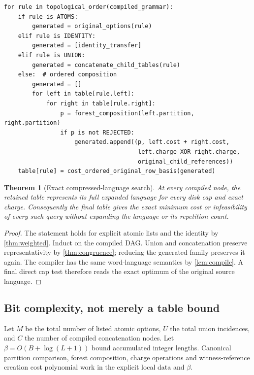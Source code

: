 \documentclass[11pt,a4paper]{article}
\newtheorem{theorem}{Theorem}[section]
\theoremstyle{definition}
\begin{document}
\begin{lstlisting}[caption={Core algorithm; every retained item points to original data.}]
for rule in topological_order(compiled_grammar):
    if rule is ATOMS:
        generated = original_options(rule)
    elif rule is IDENTITY:
        generated = [identity_transfer]
    elif rule is UNION:
        generated = concatenate_child_tables(rule)
    else:  # ordered composition
        generated = []
        for left in table[rule.left]:
            for right in table[rule.right]:
                p = forest_composition(left.partition, right.partition)
                if p is not REJECTED:
                    generated.append((p, left.cost + right.cost,
                                      left.charge XOR right.charge,
                                      original_child_references))
    table[rule] = cost_ordered_original_row_basis(generated)
\end{lstlisting}

\begin{theorem}[Exact compressed-language search]\label{thm:grammarcorrect}
At every compiled node, the retained table represents its full expanded language for every disk cap and exact charge. Consequently the final table gives the exact minimum cost or infeasibility of every such query without expanding the language or its repetition count.
\end{theorem}
\begin{proof}
The statement holds for explicit atomic lists and the identity by \cref{thm:weighted}. Induct on the compiled DAG. Union and concatenation preserve representativity by \cref{thm:congruence}; reducing the generated family preserves it again. The compiler has the same word-language semantics by \cref{lem:compile}. A final direct cap test therefore reads the exact optimum of the original source language.
\end{proof}

\subsection{Bit complexity, not merely a table bound}
Let $M$ be the total number of listed atomic options, $U$ the total union incidences, and $C$ the number of compiled concatenation nodes. Let $\beta=O(B+\log(L+1))$ bound accumulated integer lengths. Canonical partition comparison, forest composition, charge operations and witness-reference creation cost polynomial work in the explicit local data and $\beta$.
\end{document}
